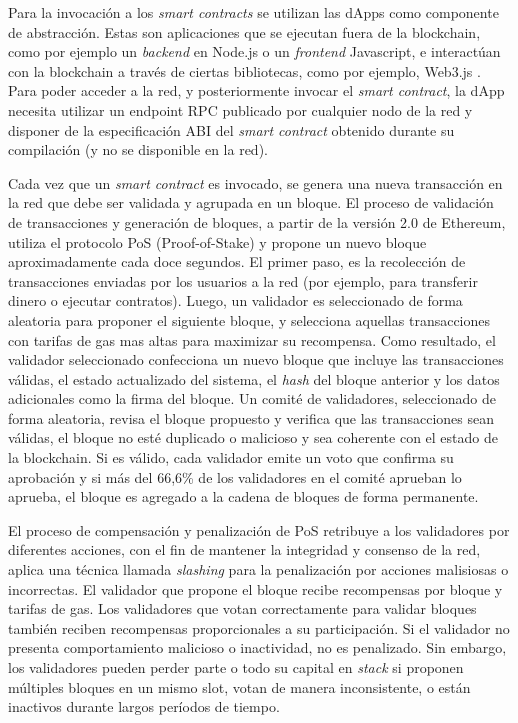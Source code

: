 Para la invocación a los \textit{smart contracts} se utilizan las dApps como componente de abstracción. Estas son aplicaciones que se ejecutan fuera de la blockchain, como por ejemplo un \textit{backend} en Node.js o un \textit{frontend} Javascript, e interactúan con la blockchain a través de ciertas bibliotecas, como por ejemplo, Web3.js \citep{web3}. Para poder acceder a la red, y posteriormente invocar el \textit{smart contract}, la dApp necesita utilizar un endpoint RPC publicado por cualquier nodo de la red y disponer de la especificación ABI del \textit{smart contract} obtenido durante su compilación (y no se disponible en la red).

Cada vez que un \textit{smart contract} es invocado, se genera una nueva transacción en la red que debe ser validada y agrupada en un bloque. El proceso de validación de transacciones y generación de bloques, a partir de la versión 2.0 de Ethereum, utiliza el protocolo PoS (Proof-of-Stake) \citep{PoS} y propone un nuevo bloque aproximadamente cada doce segundos. El primer paso, es la recolección de transacciones enviadas por los usuarios a la red (por ejemplo, para transferir dinero o ejecutar contratos). Luego, un validador es seleccionado de forma aleatoria para proponer el siguiente bloque, y selecciona aquellas transacciones con tarifas de gas mas altas para maximizar su recompensa. Como resultado, el validador seleccionado confecciona un nuevo bloque que incluye las transacciones válidas, el estado actualizado del sistema, el \textit{hash} del bloque anterior y los datos adicionales como la firma del bloque. Un comité de validadores, seleccionado de forma aleatoria, revisa el bloque propuesto y verifica que las transacciones sean válidas, el bloque no esté duplicado o malicioso y sea coherente con el estado de la blockchain. Si es válido, cada validador emite un voto que confirma su aprobación y si más del 66,6\% de los validadores en el comité aprueban lo aprueba, el bloque es agregado a la cadena de bloques de forma permanente.

El proceso de compensación y penalización de PoS retribuye a los validadores por diferentes acciones, con el fin de mantener la integridad y consenso de la red, aplica una técnica llamada \textit{slashing} para la penalización por acciones malisiosas o incorrectas. El validador que propone el bloque recibe recompensas por bloque y tarifas de gas. Los validadores que votan correctamente para validar bloques también reciben recompensas proporcionales a su participación. Si el validador no presenta comportamiento malicioso o inactividad, no es penalizado. Sin embargo, los validadores pueden perder parte o todo su capital en \textit{stack} si proponen múltiples bloques en un mismo slot, votan de manera inconsistente, o están inactivos durante largos períodos de tiempo.

